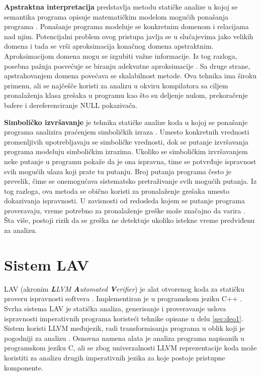 \documentclass[12pt,oneside]{memoir}
\begin{document}
\par
\textbf{Apstraktna interpretacija} predstavlja metodu statičke analize u kojoj se semantika programa opisuje matematičkim modelom mogućih ponašanja programa \cite{AbstractInterpretation}. Ponašanje programa modeluje se konkretnim domenom i relacijama nad njim. Potencijalni problem ovog pristupa javlja se u slučajevima jako velikih domena i tada se vrši aproksimacija konačnog domena apstraktnim. Aproksimacijom domena mogu se izgubiti važne informacije. Iz tog razloga, posebna pažnja posvećuje se biranju adekvatne aproksimacije \cite{AbstractInterpretation2}. Sa druge strane, apstrahovanjem domena povećava se skalabilnost metode. Ova tehnika ima široku primenu, ali se najčešče koristi za analizu u okviru kompilatora sa ciljem pronalaženja klasa grešaka u programu kao što su deljenje nulom, prekoračenje bafere i dereferenciranje NULL pokazivača.
\par
\textbf{Simboličko izvršavanje} je tehnika statičke analize koda u kojoj se ponašanje programa analizira praćenjem simboličkih izraza \cite{SymbolicExecution}. Umesto konkretnih vrednosti promenljivih upotrebljavaju se simboličke vrednosti, dok se putanje izvršavanja programa modeluju simboličkim izrazima. Ukoliko se simboličkim izvršavanjem neke putanje u programu pokaže da je ona ispravna, time se potvrđuje ispravnost svih mogućih ulaza koji prate tu putanju. Broj putanja programa često je prevelik, čime se onemogućava sistematsko pretraživanje svih mogućih putanja. Iz tog razloga, ova metoda se obično koristi za pronalaženje grešaka umesto dokazivanja ispravnosti. U zavisnosti od redosleda kojem se putanje programa proveravaju, vreme potrebno za pronalaženje greške može značajno da varira \cite{LAVDevelopment}. Šta više, postoji rizik da se greška ne detektuje ukoliko istekne vreme predviđenu za analizu.
\section{Sistem LAV}  \label{sec:deo2}
LAV (akronim \textit{\textbf{L}LVM \textbf{A}utomated \textbf{V}erifier}) je alat otvorenog koda za statičku proveru ispravnosti softvera \cite{LAVTool}. Implementiran je u programskom jeziku C++ \cite{LAVCode}. Svrha sistema LAV je statička analiza, generisanje i proveravanje uslova ispravnosti imperativnih programa koristeći tehnike opisane u delu \ref{sec:deo1}. Sistem koristi LLVM međujezik, radi transformisanja programa u oblik koji je pogodniji za analizu \cite{LLVMTool}. Osnovna namena alata je analiza programa napisanih u programskom jeziku C, ali se zbog univerzalnosti LLVM reprezentacije koda može koristiti za analizu drugih imperativnih jezika za koje postoje pristupne komponente. \par
\end{document}
